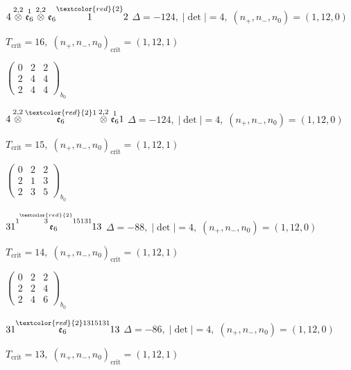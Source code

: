 \documentclass[10pt]{article}
\begin{document}
$4\overset{2,2}{\otimes}\overset{1}{\mathfrak{e}_6}\overset{2,2}{\otimes}\mathfrak{e}_6\overset{\textcolor{red}{2}}{1}2$ \quad $\Delta=-124,\; |\det|=4,\; (n_+,n_-,n_0)=(1,12,0)$

\hspace{1em}$T_{\text{crit}}=16,\; (n_+,n_-,n_0)_{\text{crit}}=(1,12,1)$

\hspace{2em}$\left(\begin{smallmatrix}0 & 2 & 2 \\ 2 & 4 & 4 \\ 2 & 4 & 4\end{smallmatrix}\right)_{\!b_0}$

\smallskip

$4\overset{2,2}{\otimes}\overset{\textcolor{red}{2}1}{\mathfrak{e}_6}\overset{2,2}{\otimes}\overset{1}{\mathfrak{e}_6}1$ \quad $\Delta=-124,\; |\det|=4,\; (n_+,n_-,n_0)=(1,12,0)$

\hspace{1em}$T_{\text{crit}}=15,\; (n_+,n_-,n_0)_{\text{crit}}=(1,12,1)$

\hspace{2em}$\left(\begin{smallmatrix}0 & 2 & 2 \\ 2 & 1 & 3 \\ 2 & 3 & 5\end{smallmatrix}\right)_{\!b_0}$

\smallskip

$31\overset{1\overset{\textcolor{red}{2}}{3}15131}{\mathfrak{e}_6}13$ \quad $\Delta=-88,\; |\det|=4,\; (n_+,n_-,n_0)=(1,12,0)$

\hspace{1em}$T_{\text{crit}}=14,\; (n_+,n_-,n_0)_{\text{crit}}=(1,12,1)$

\hspace{2em}$\left(\begin{smallmatrix}0 & 2 & 2 \\ 2 & 2 & 4 \\ 2 & 4 & 6\end{smallmatrix}\right)_{\!b_0}$

$31\overset{\textcolor{red}{2}1315131}{\mathfrak{e}_6}13$ \quad $\Delta=-86,\; |\det|=4,\; (n_+,n_-,n_0)=(1,12,0)$

\hspace{1em}$T_{\text{crit}}=13,\; (n_+,n_-,n_0)_{\text{crit}}=(1,12,1)$
\end{document}
